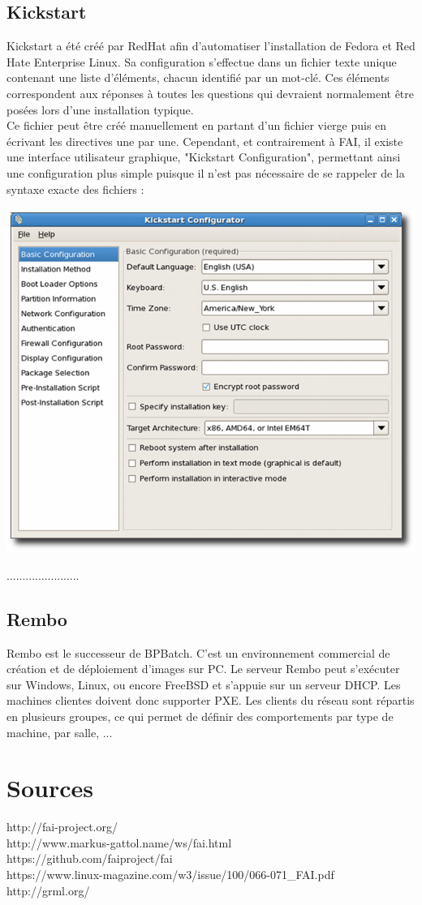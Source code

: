 \documentclass[a4paper,12pt,one side,titlepage]{report}
\begin{document}
\section{Kickstart}
Kickstart a été créé par RedHat afin d'automatiser l'installation de Fedora et Red Hate Enterprise Linux. Sa configuration s'effectue dans un fichier texte unique contenant une liste d'éléments, chacun identifié par un mot-clé. Ces éléments correspondent aux réponses à toutes les questions qui devraient normalement être posées lors d'une installation typique.\\
Ce fichier peut être créé manuellement en partant d'un fichier vierge puis en écrivant les directives une par une.
Cependant, et contrairement à FAI, il existe une interface utilisateur graphique, "Kickstart Configuration", permettant ainsi une configuration plus simple puisque il n'est pas nécessaire de se rappeler de la syntaxe exacte des fichiers :\\
\begin{center}\includegraphics[scale=0.5]{./img/kickstart.png}\end{center}
.......................

\section{Rembo}
Rembo est le successeur de BPBatch. C’est un environnement commercial de création et de déploiement d’images sur PC. Le serveur Rembo peut s’exécuter sur Windows, Linux, ou encore FreeBSD et s’appuie sur un serveur DHCP. Les machines clientes doivent donc supporter PXE. Les clients du réseau sont répartis en plusieurs groupes, ce qui permet de définir des comportements par type de machine, par salle, ... 

\chapter{Sources}
http://fai-project.org/\\
http://www.markus-gattol.name/ws/fai.html\\
https://github.com/faiproject/fai\\
https://www.linux-magazine.com/w3/issue/100/066-071\_FAI.pdf\\
http://grml.org/\\
\end{document}
